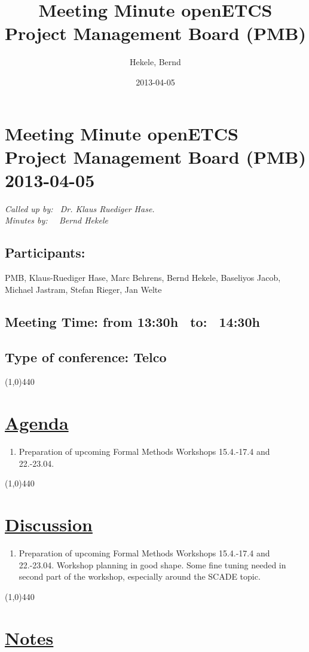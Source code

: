 \documentclass[a4paper]{article}
\title{Meeting Minute openETCS Project Management Board (PMB)}
\author{Hekele, Bernd}
\date{2013-04-05}
\begin{document}
\section*{\large{Meeting Minute openETCS Project Management Board (PMB) 2013-04-05}}

\emph{Called up by: \ Dr. Klaus Ruediger Hase.}\\
\emph{Minutes by: \ \  Bernd Hekele}


\subsection*{Participants:} PMB, 
Klaus-Ruediger Hase, 
Marc Behrens, 
Bernd Hekele,
Baseliyos Jacob,
Michael Jastram, 
Stefan Rieger, 
Jan Welte\\



\subsection*{Meeting Time: from 13:30h \ to: \ 14:30h}

\subsection*{Type of conference: Telco}

\line(1,0){440}
\section*{\underline{Agenda}}
\begin{enumerate}

\item Preparation of upcoming Formal Methods Workshops 15.4.-17.4 and 22.-23.04.

\end{enumerate}
\line(1,0){440}
\section*{\underline{Discussion}}

\begin{enumerate}
\item Preparation of upcoming Formal Methods Workshops 15.4.-17.4 and 22.-23.04.
Workshop planning in good shape. Some fine tuning needed in second part of the workshop, especially around the SCADE topic.
\end{enumerate}
\line(1,0){440}
\section*{\underline{Notes}}
\end{document}
